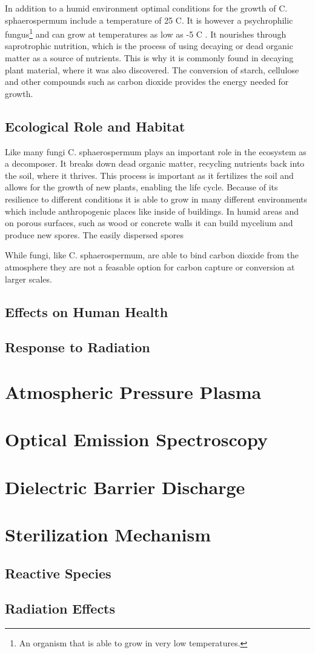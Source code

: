 In addition to a humid environment optimal conditions for the growth of C. sphaerospermum include a temperature of 25  \textdegree C. It is however a  psychrophilic fungus\footnote{An organism that is able to grow in very low temperatures.} and can grow at temperatures as low as -5 \textdegree C \cite{mould}. It nourishes through saprotrophic nutrition, which is the process of using decaying or dead organic matter as a source of nutrients. This is why it is commonly found in decaying plant material, where it was also discovered. The conversion of starch, cellulose and other compounds such as carbon dioxide provides the energy needed for growth.

\subsection{Ecological Role and Habitat}
Like many fungi C. sphaerospermum plays an important role in the ecosystem as a decomposer. It breaks down dead organic matter, recycling nutrients back into the soil, where it thrives. This process is important as it fertilizes the soil and allows for the growth of new plants, enabling the life cycle. Because of its resilience to different conditions it is able to grow in many different environments which include anthropogenic places like inside of buildings. In humid areas and on porous surfaces, such as wood or concrete walls it can build mycelium and produce new spores. The easily dispersed spores 

While fungi, like C. sphaerospermum, are able to bind carbon dioxide from the atmosphere they are not a feasable option for carbon capture or conversion at larger scales.
\subsection{Effects on Human Health}
\subsection{Response to Radiation}

\section{Atmospheric Pressure Plasma}
\section{Optical Emission Spectroscopy}
\section{Dielectric Barrier Discharge}

\section{Sterilization Mechanism}
\subsection{Reactive Species}
\subsection{Radiation Effects}
